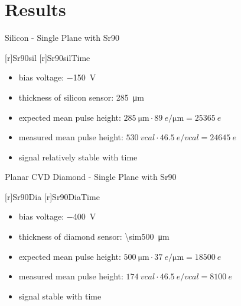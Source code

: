 \section{Results}
\begin{frame}{Silicon - Single Plane with Sr90}

	\subfigs
		{[r]{Sr90sil}}
		{[r]{Sr90silTime}}
	
	\begin{itemize}\itemfill
		\item bias voltage: \SI{-150}{\volt}
		\item thickness of silicon sensor: \SI{285}{\um}
		\item expected mean pulse height: $\SI{285}{\um}\cdot\SI{89}{e/\um} = \SI{25365}{e} $
		\item measured mean pulse height: $\SI{530}{vcal}\cdot\SI{46.5}{e/vcal} = \SI{24645}{e} $
		\item signal relatively stable with time
		
	\end{itemize}
	
\end{frame}
\begin{frame}{Planar CVD Diamond - Single Plane with Sr90}

	\subfigs
		{[r]{Sr90Dia}}
		{[r]{Sr90DiaTime}}
	
	\begin{itemize}\itemfill
		\item bias voltage: \SI{-400}{\volt}
		\item thickness of diamond sensor: \SI{\sim500}{\um}
		\item expected mean pulse height: $\SI{500}{\um}\cdot\SI{37}{e/\um} = \SI{18500}{e} $
		\item measured mean pulse height: $\SI{174}{vcal}\cdot\SI{46.5}{e/vcal} = \SI{8100}{e} $
		\item signal stable with time
		
	\end{itemize}
	
\end{frame}
